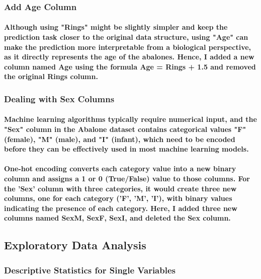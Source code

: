 \documentclass[11pt]{article} %
\begin{document}
\subsubsection{Add Age Column}
\paragraph{Although using "Rings" might be slightly simpler and keep the prediction task closer to the original data structure, using "Age" can make the prediction more interpretable from a biological perspective, as it directly represents the age of the abalones. Hence, I added a new column named Age using the formula Age = Rings + 1.5 and removed the original Rings column.}
\subsubsection{Dealing with Sex Columns}
\paragraph{Machine learning algorithms typically require numerical input, and the "Sex" column in the Abalone dataset contains categorical values "F" (female), "M" (male), and "I" (infant), which need to be encoded before they can be effectively used in most machine learning models.}
\paragraph{One-hot encoding converts each category value into a new binary column and assigns a 1 or 0 (True/False) value to those columns. For the 'Sex' column with three categories, it would create three new columns, one for each category ('F', 'M', 'I'), with binary values indicating the presence of each category. Here, I added three new columns named SexM, SexF, SexI, and deleted the Sex column.}
% 
% 
\subsection{Exploratory Data Analysis}
\subsubsection{Descriptive Statistics for Single Variables}
\end{document}
